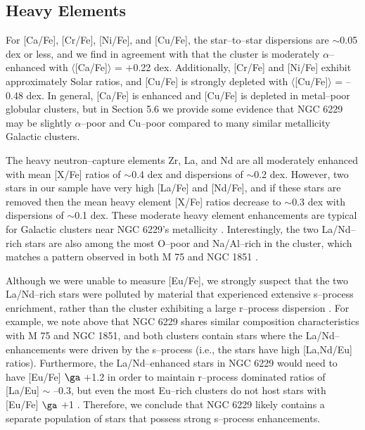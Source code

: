 \documentclass[12pt,preprint]{emulateapj}
\begin{document}
\subsection{Heavy Elements}

For [Ca/Fe], [Cr/Fe], [Ni/Fe], and [Cu/Fe], the star--to--star dispersions
are $\sim$0.05 dex or less, and we find in agreement with \citet{Pilachowski83}
that the cluster is moderately $\alpha$--enhanced with 
$\langle$[Ca/Fe]$\rangle$ = $+$0.22 dex.  Additionally, [Cr/Fe] and [Ni/Fe] 
exhibit approximately Solar ratios, and [Cu/Fe] is strongly depleted with 
$\langle$[Cu/Fe]$\rangle$ = --0.48 dex.  In general, [Ca/Fe] is enhanced and
[Cu/Fe] is depleted in metal--poor globular clusters, but in Section 5.6 we 
provide some evidence that NGC 6229 may be slightly $\alpha$--poor and Cu--poor
compared to many similar metallicity Galactic clusters.

The heavy neutron--capture elements Zr, La, and Nd are all moderately enhanced
with mean [X/Fe] ratios of $\sim$0.4 dex and dispersions of $\sim$0.2 dex.
However, two stars in our sample have very high [La/Fe] and [Nd/Fe], and if
these stars are removed then the mean heavy element [X/Fe] ratios decrease to
$\sim$0.3 dex with dispersions of $\sim$0.1 dex.  These moderate heavy element
enhancements are typical for Galactic clusters near NGC 6229's metallicity 
\citep[e.g.,][]{James04}.  Interestingly, the two La/Nd--rich stars are also
among the most O--poor and Na/Al--rich in the cluster, which matches a pattern
observed in both M 75 \citep{Kacharov13} and NGC 1851 \citep[][see also Section
5.5]{Carretta11}.

Although we were unable to measure [Eu/Fe], we strongly suspect that the two
La/Nd--rich stars were polluted by material that experienced extensive
s--process enrichment, rather than the cluster exhibiting a large r--process
dispersion \citep[e.g.,][]{Roederer11}.  For example, we note above that 
NGC 6229 shares similar composition characteristics with M 75 and NGC 1851, 
and both clusters contain stars where the La/Nd--enhancements were driven by 
the s--process (i.e., the stars have high [La,Nd/Eu] ratios).  Furthermore, 
the La/Nd--enhanced stars in NGC 6229 would need to have [Eu/Fe] $\ga$ $+$1.2 
in order to maintain r--process dominated ratios of [La/Eu] $\sim$ --0.3, but 
even the most Eu--rich clusters do not host stars with [Eu/Fe] $\ga$ $+$1 
\citep[e.g.,][]{Johnson17b}.  Therefore, we conclude that NGC 6229 likely 
contains a separate population of stars that possess strong s--process 
enhancements.
\end{document}
